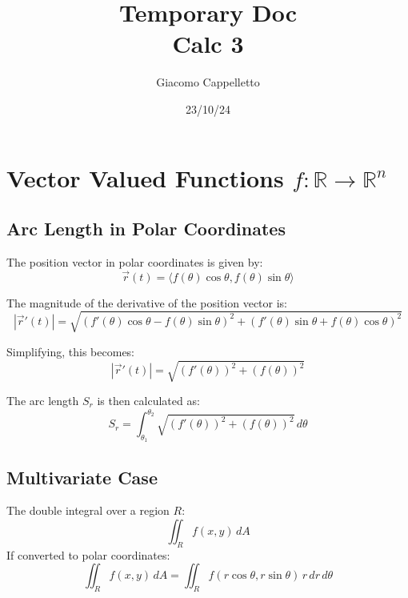 \documentclass{report}
\title{\Huge{Temporary Doc}\\Calc 3}
\author{\huge{Giacomo Cappelletto}}
\date{23/10/24}
\begin{document}
\maketitle
\pagebreak
{}
\tableofcontents
\pagebreak

\chapter{Vector Valued Functions $f:\mathbb{R} \rightarrow \mathbb{R}^n$}

\section{Arc Length in Polar Coordinates}

The position vector in polar coordinates is given by:
\[
	\vec{r}(t) = \langle f(\theta) \cos\theta, f(\theta) \sin\theta \rangle
\]

The magnitude of the derivative of the position vector is:
\[
	|\vec{r}'(t)| = \sqrt{ \left( f'(\theta) \cos\theta - f(\theta) \sin\theta \right)^2
		+ \left( f'(\theta) \sin\theta + f(\theta) \cos\theta \right)^2 }
\]

Simplifying, this becomes:
\[
	|\vec{r}'(t)| = \sqrt{ \left( f'(\theta) \right)^2 + \left( f(\theta) \right)^2 }
\]

The arc length \(S_r\) is then calculated as:
\[
	S_r = \int_{\theta_1}^{\theta_2} \sqrt{\left(f'(\theta)\right)^2 + \left(f(\theta)\right)^2} \, d\theta
\]




\section{Multivariate Case}

The double integral over a region \(R\):
\[
	\iint_R f(x, y) \, dA
\]
If converted to polar coordinates:
\[
	\iint_R f(x, y) \, dA = \iint_R f(r\cos\theta, r\sin\theta) \, r \, dr \, d\theta
\]
\end{document}
